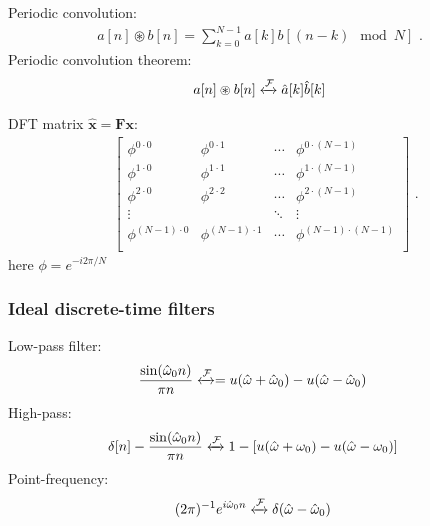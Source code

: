 \documentclass[6pt,landscape,a4paper]{article}
\begin{document}
\begin{multicols*}{5}
Periodic convolution:
\begin{align*}
  a[n] \circledast b[n] = \textstyle\sum_{k=0}^{N-1} a[k]b[(n-k) \mod N] \,\,.
\end{align*}
Periodic convolution theorem:
\begin{align*}
    a[n] \circledast b[n] \xleftrightarrow{\mathcal{F}} \hat{a}[k]\hat{b}[k]
\end{align*}

DFT matrix $\bm{\hat{x}}=\bm{F}\bm{x}$:
\begin{align*}
&\begin{bmatrix}
                               \phi^{0\cdot0}     & \phi^{0 \cdot 1}         & \cdots & \phi^{0 \cdot (N-1)}     \\
                               \phi^{1\cdot0}     & \phi^{1 \cdot 1}        & \cdots & \phi^{1 \cdot (N-1)}     \\
                               \phi^{2\cdot0}      & \phi^{2 \cdot 2}     & \cdots & \phi^{2 \cdot (N-1)}     \\
                               \vdots             &                      &                       \ddots & \vdots                   \\
                               \phi^{(N-1)\cdot0} & \phi^{(N-1) \cdot 1}  & \cdots & \phi^{(N-1) \cdot (N-1)} \\
                             \end{bmatrix} \,\,.
\end{align*}
here $\phi=e^{-i 2\pi/N}$
\subsubsection*{Ideal discrete-time filters}
Low-pass filter:
\vspace{-0.2em}
\begin{align*}
    \frac{\sin(\hat{\omega}_0 n)}{\pi n}  &\xleftrightarrow{\mathcal{F}}  = u(\hat{\omega}+\hat{\omega}_0)-u(\hat{\omega}-\hat{\omega}_0)
\end{align*}
High-pass:
\vspace{-0.2em}
\begin{align*}
\delta[n] - \frac{\sin(\hat{\omega}_0 n)}{\pi n} &\xleftrightarrow{\mathcal{F}}  1-[u(\hat{\omega}+\omega_0)-u(\hat{\omega}-\omega_0)] 
\end{align*}
Point-frequency:
\vspace{-0.8em}
\begin{align*}
    (2\pi)^{-1} e^{i\hat{\omega}_0 n} &\xleftrightarrow{\mathcal{F}}  \delta(\hat{\omega}-\hat{\omega}_0)
\end{align*}

\end{multicols*}
\end{document}
